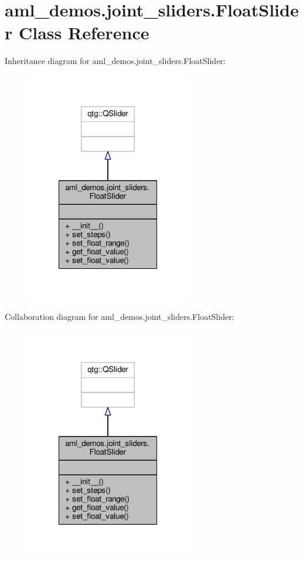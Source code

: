 \hypertarget{classaml__demos_1_1joint__sliders_1_1_float_slider}{\section{aml\-\_\-demos.\-joint\-\_\-sliders.\-Float\-Slider Class Reference}
\label{classaml__demos_1_1joint__sliders_1_1_float_slider}
}


Inheritance diagram for aml\-\_\-demos.\-joint\-\_\-sliders.\-Float\-Slider\-:
\nopagebreak
\begin{figure}[H]
\begin{center}
\leavevmode
\includegraphics[width=204pt]{classaml__demos_1_1joint__sliders_1_1_float_slider__inherit__graph}
\end{center}
\end{figure}


Collaboration diagram for aml\-\_\-demos.\-joint\-\_\-sliders.\-Float\-Slider\-:
\nopagebreak
\begin{figure}[H]
\begin{center}
\leavevmode
\includegraphics[width=204pt]{classaml__demos_1_1joint__sliders_1_1_float_slider__coll__graph}
\end{center}
\end{figure}
